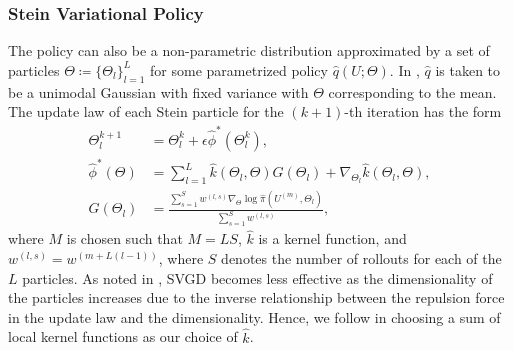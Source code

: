 \documentclass[twoside,11pt]{article}
\begin{document}
\subsubsection{Stein Variational Policy}
The policy can also be a non-parametric distribution approximated by a set of particles $\Theta\coloneqq\{\Theta_l\}_{l=1}^L$ for some parametrized policy $\hat{q}(U; \Theta)$. In \cite{lambert2020stein}, $\hat{q}$ is taken to be a unimodal Gaussian with fixed variance with $\Theta$ corresponding to the mean.
The update law of each Stein particle for the $(k+1)$-th iteration has the form
\begin{subequations}
\begin{align}
    \Theta_l^{k+1}
        &= \Theta_l^{k} + \epsilon \hat{\phi}^*(\Theta_l^k), \\
    \hat{\phi}^*(\Theta)
        &= \sum_{l=1}^L \hat{k}(\Theta_{l}, \Theta) G(\Theta_l) + \nabla_{\Theta_l} \hat{k}(\Theta_l, \Theta), \\
    G(\Theta_l) &= \frac{\sum_{s=1}^S w^{(l, s)} \nabla_\Theta \log \hat{\pi}(U^{(m)}, \Theta_{l})}{\sum_{s=1}^S w^{(l, s)}} ,
\end{align}
\end{subequations}
where $M$ is chosen such that $M = LS$, $\hat{k}$ is a kernel function, and $w^{(l, s)} = w^{(m+L(l-1))}$, where $S$ denotes the number of rollouts for each of the $L$ particles.
As noted in \cite{zhuo2018message}, \ac{SVGD} becomes less effective as the dimensionality of the particles increases due to the inverse relationship between the repulsion force in the update law and the dimensionality.
Hence, we follow \cite{lambert2020stein} in choosing a sum of local kernel functions as our choice of $\hat{k}$.
\end{document}
